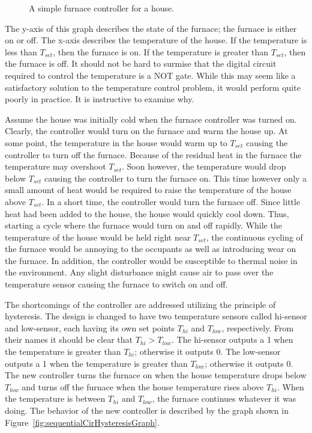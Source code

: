 \begin{figure}[ht]
    \caption{A simple furnace controller for a house.}
    \label{fig:sequentialCirSimpleFurnace}
\end{figure}

The y-axis of this graph describes the state of the furnace;
the furnace is either on or off.  The x-axis describes the
temperature of the house.
If the temperature is less than $T_{set}$, then the furnace is on.
If the temperature is greater than $T_{set}$, then the furnace is off.
It should not be hard to surmise that the digital circuit required to
control the temperature is a NOT gate.  While this may seem like a
satisfactory solution to the temperature control problem, it would
perform quite poorly in practice.  It is instructive to examine why.

Assume the house was initially cold when the
furnace controller was turned on.  Clearly, the controller would turn on the furnace
and warm the house up. At some point, the temperature in the house would
warm up to $T_{set}$ causing the controller to turn off the furnace.
Because of the residual heat in the furnace the temperature may overshoot
$T_{set}$.  Soon however, the temperature would drop below $T_{set}$ causing
the controller to turn the furnace on.  This time however only a small amount
of heat would be required to raise the temperature of the house
above $T_{set}$.  In a short time, the controller would turn the furnace off.
Since little heat had been added to the house, the house would quickly cool
down.  Thus, starting a cycle where the furnace would turn on and off
rapidly. While the temperature of the house would be held right near
$T_{set}$, the continuous cycling of the furnace would be annoying to
the occupants as well as introducing wear on the furnace.  In addition, the
controller would be susceptible to thermal noise in the environment.  Any
slight disturbance might cause air to pass over the temperature
sensor causing the furnace to switch on and off.

The shortcomings of the controller are addressed utilizing the principle
of hysteresis.  The design is changed to have two temperature
sensors called hi-sensor and low-sensor, each having its own set
points $T_{hi}$ and
$T_{low}$, respectively. From their names it should be clear that
$T_{hi} > T_{low}$.
The hi-sensor outputs a 1 when the temperature is greater than
$T_{hi}$; otherwise it outputs 0.
The low-sensor outputs a 1 when the temperature is greater than
$T_{low}$; otherwise it outputs 0.
The new controller turns the furnace on when the house temperature
drops below $T_{low}$ and turns off the furnace when the house temperature
rises above $T_{hi}$.  When the temperature is between $T_{hi}$ and
$T_{low}$, the furnace continues whatever it was doing.
The behavior of the new controller is described by the graph shown in
Figure~\ref{fig:sequentialCirHysteresisGraph}.

